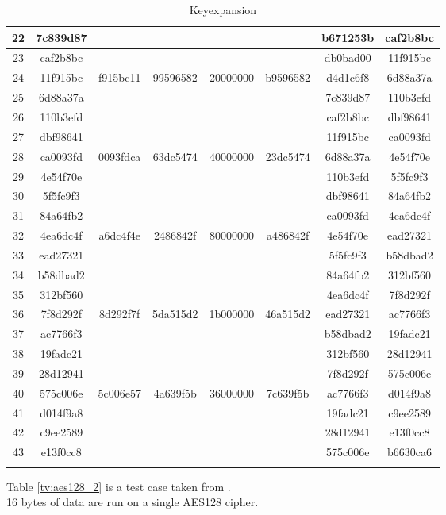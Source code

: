 \begin{small}
\begin{longtable}{| c | c | c | c | c | c | c | c |}
    22 & 7c839d87 & & & & & b671253b & caf2b8bc \\ \hline
    23 & caf2b8bc & & & & & db0bad00 & 11f915bc \\ \hline
    24 & 11f915bc & f915bc11 & 99596582 & 20000000
    & b9596582 & d4d1c6f8 & 6d88a37a \\ \hline
    25 & 6d88a37a & & & & & 7c839d87 & 110b3efd \\ \hline
    26 & 110b3efd & & & & & caf2b8bc & dbf98641 \\ \hline
    27 & dbf98641 & & & & & 11f915bc & ca0093fd \\ \hline
    28 & ca0093fd & 0093fdca & 63dc5474 & 40000000
    & 23dc5474 & 6d88a37a & 4e54f70e \\ \hline
    29 & 4e54f70e & & & & & 110b3efd & 5f5fc9f3 \\ \hline
    30 & 5f5fc9f3 & & & & & dbf98641 & 84a64fb2 \\ \hline
    31 & 84a64fb2 & & & & & ca0093fd & 4ea6dc4f \\ \hline
    32 & 4ea6dc4f & a6dc4f4e & 2486842f & 80000000
    & a486842f & 4e54f70e & ead27321 \\ \hline
    33 & ead27321 & & & & & 5f5fc9f3 & b58dbad2 \\ \hline
    34 & b58dbad2 & & & & & 84a64fb2 & 312bf560 \\ \hline
    35 & 312bf560 & & & & & 4ea6dc4f & 7f8d292f \\ \hline
    36 & 7f8d292f & 8d292f7f & 5da515d2 & 1b000000
    & 46a515d2 & ead27321 & ac7766f3 \\ \hline
    37 & ac7766f3 & & & & & b58dbad2 & 19fadc21 \\ \hline
    38 & 19fadc21 & & & & & 312bf560 & 28d12941 \\ \hline
    39 & 28d12941 & & & & & 7f8d292f & 575c006e \\ \hline
    40 & 575c006e & 5c006e57 & 4a639f5b & 36000000
    & 7c639f5b & ac7766f3 & d014f9a8 \\ \hline
    41 & d014f9a8 & & & & & 19fadc21 & c9ee2589 \\ \hline
    42 & c9ee2589 & & & & & 28d12941 & e13f0cc8 \\ \hline
    43 & e13f0cc8 & & & & & 575c006e & b6630ca6 \\ \hline
    \caption{Keyexpansion}
    \label{tv:keyexpansion}
  \end{longtable}
\end{small}

Table \ref{tv:aes128_2} is a test case taken from 
\citet[pp. 35--36]{AES:2001}.\\
16 bytes of data are run on a single AES128 cipher.


